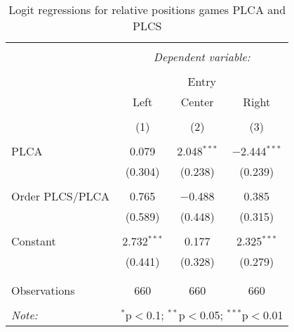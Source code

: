 \begin{table}[!htbp] \centering 
  \caption{Logit regressions for relative positions games PLCA and PLCS} 
  \label{} 
\begin{tabular}{@{\extracolsep{5pt}}lccc} 
\\[-1.8ex]\hline 
\hline \\[-1.8ex] 
 & \multicolumn{3}{c}{\textit{Dependent variable:}} \\ 
\cline{2-4} 
\\[-1.8ex] & \multicolumn{3}{c}{Entry} \\ 
 & Left & Center & Right \\ 
\\[-1.8ex] & (1) & (2) & (3)\\ 
\hline \\[-1.8ex] 
 PLCA & 0.079 & 2.048$^{***}$ & $-$2.444$^{***}$ \\ 
  & (0.304) & (0.238) & (0.239) \\ 
  & & & \\ 
 Order PLCS/PLCA & 0.765 & $-$0.488 & 0.385 \\ 
  & (0.589) & (0.448) & (0.315) \\ 
  & & & \\ 
 Constant & 2.732$^{***}$ & 0.177 & 2.325$^{***}$ \\ 
  & (0.441) & (0.328) & (0.279) \\ 
  & & & \\ 
\hline \\[-1.8ex] 
Observations & 660 & 660 & 660 \\ 
\hline 
\hline \\[-1.8ex] 
\textit{Note:}  & \multicolumn{3}{r}{$^{*}$p$<$0.1; $^{**}$p$<$0.05; $^{***}$p$<$0.01} \\ 
\end{tabular} 
\end{table} 


